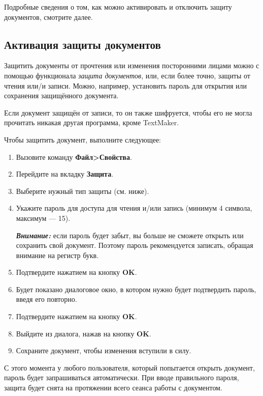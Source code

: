 ﻿\documentclass[a4paper,10pt]{article}
\begin{document}
Подробные сведения о том, как можно активировать и отключить защиту документов, смотрите далее.

\subsection{Активация защиты документов}
Защитить документы от прочтения или изменения посторонними лицами можно с помощью функционала \textit{защита документов}, или, если более точно, защиты от чтения или/и записи. Можно, например, установить пароль для открытия или сохранения защищённого документа.

Если документ защищён от записи, то он также шифруется, чтобы его не могла прочитать никакая другая программа, кроме TextMaker.

Чтобы защитить документ, выполните следующее:
\begin{enumerate}
 \item Вызовите команду \textbf{Файл>Свойства}.
 \item Перейдите на вкладку \textbf{Защита}.
 \item Выберите нужный тип защиты (см. ниже).
 \item Укажите пароль для доступа для чтения и/или запись (минимум 4 символа, максимум — 15).\\
 \begin{mdframed}[backgroundcolor=blue!10]
\textbf{\textit{Внимание:}} если пароль будет забыт, вы больше не сможете открыть или сохранить свой документ. Поэтому пароль рекомендуется записать, обращая внимание на регистр букв.
\end{mdframed}
\item Подтвердите нажатием на кнопку \textbf{OK}. 
\item Будет показано диалоговое окно, в котором нужно будет подтвердить пароль, введя его повторно.
\item Подтвердите нажатием на кнопку \textbf{OK}.
\item Выйдите из диалога, нажав на кнопку \textbf{OK}.
\item Сохраните документ, чтобы изменения вступили в силу.
\end{enumerate}

С этого момента у любого пользователя, который попытается открыть документ, пароль будет запрашиваться автоматически. При вводе правильного пароля, защита будет снята на протяжении всего сеанса работы с документом.
\end{document}
